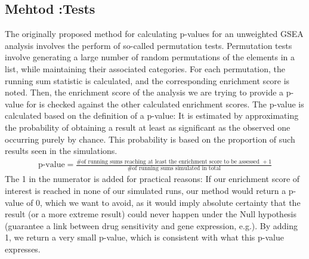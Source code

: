 \subsection{Mehtod :\@Permutation Tests}\label{subsec:p-value-perm}
The originally proposed method for calculating p-values for an unweighted GSEA analysis involves the perform of so-called permutation tests.
Permutation tests involve generating a large number of random permutations of the elements in a list, while maintaining their associated categories. For each permutation, the running sum statistic is calculated, and the corresponding enrichment score is noted. Then, the enrichment score of the analysis we are trying to provide a p-value for is checked against the other calculated enrichment scores. The p-value is calculated based on the definition of a p-value: It is estimated by approximating the probability of obtaining a result at least as significant as the observed one occurring purely by chance. This probability is based on the proportion of such results seen in the simulations.
\begin{align}
\text{p-value} = \frac{\text{\# of running sums reaching at least the enrichment score to be assessed } +1 }{\text{\# of running sums simulated in total}}
\end{align}
The 1 in the numerator is added for practical reasons: If our enrichment score of interest is reached in none of our simulated runs, our method would return a p-value of $0$, which we want to avoid, as it would imply absolute certainty that the result (or a more extreme result) could never happen under the Null hypothesis (guarantee a link between drug sensitivity and gene expression, e.g.).
By adding 1, we return a very small p-value, which is consistent with what this p-value expresses.
